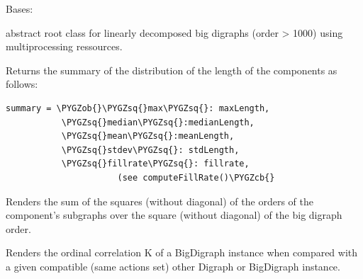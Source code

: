 \documentclass[letterpaper,10pt,english]{sphinxmanual}
\def\PYGZob{\char`\{}
\def\PYGZcb{\char`\}}
\def\PYGZsq{\char`\'}
\renewcommand\PYGZsq{\textquotesingle}
\begin{document}
\begin{fulllineitems}
\label{techDoc:bigOutrankingDigraphs.BigDigraph}
Bases: \href{http://docs.python.org/library/functions.html\#object}{}

abstract root class for linearly decomposed big digraphs (order \textgreater{} 1000)
using multiprocessing ressources.

\begin{fulllineitems}
\label{techDoc:bigOutrankingDigraphs.BigDigraph.computeDecompositionSummaryStatistics}
Returns the summary of the distribution of the length of
the components as follows:

\begin{Verbatim}[commandchars=\\\{\}]
summary = \PYGZob{}\PYGZsq{}max\PYGZsq{}: maxLength,
           \PYGZsq{}median\PYGZsq{}:medianLength,
           \PYGZsq{}mean\PYGZsq{}:meanLength,
           \PYGZsq{}stdev\PYGZsq{}: stdLength,
           \PYGZsq{}fillrate\PYGZsq{}: fillrate,
                      (see computeFillRate()\PYGZcb{}
\end{Verbatim}

\end{fulllineitems}


\begin{fulllineitems}
\label{techDoc:bigOutrankingDigraphs.BigDigraph.computeFillRate}
Renders the sum of the squares (without diagonal) of the orders of the component's subgraphs
over the square (without diagonal) of the big digraph order.

\end{fulllineitems}


\begin{fulllineitems}
\label{techDoc:bigOutrankingDigraphs.BigDigraph.computeOrdinalCorrelation}
Renders the ordinal correlation K of a BigDigraph instance
when compared with a given compatible (same actions set) other Digraph or
BigDigraph instance.


\end{fulllineitems}
\end{fulllineitems}
\end{document}
